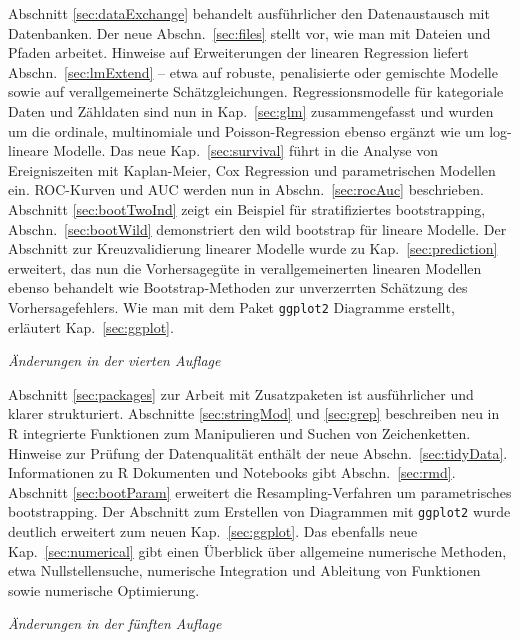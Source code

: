 Abschnitt \ref{sec:dataExchange} behandelt ausführlicher den Datenaustausch mit Datenbanken. Der neue  Abschn.\ \ref{sec:files} stellt vor, wie man mit Dateien und Pfaden arbeitet. Hinweise auf Erweiterungen der linearen Regression liefert Abschn.\ \ref{sec:lmExtend} -- etwa auf robuste, penalisierte oder gemischte Modelle sowie auf verallgemeinerte Schätzgleichungen. Regressionsmodelle für kategoriale Daten und Zähldaten sind nun in Kap.\ \ref{sec:glm} zusammengefasst und wurden um die ordinale, multinomiale und Poisson-Regression ebenso ergänzt wie um log-lineare Modelle. Das neue Kap.\ \ref{sec:survival} führt in die Analyse von Ereigniszeiten mit Kaplan-Meier, Cox Regression und parametrischen Modellen ein. ROC-Kurven und AUC werden nun in Abschn.\ \ref{sec:rocAuc} beschrieben. Abschnitt \ref{sec:bootTwoInd} zeigt ein Beispiel für stratifiziertes bootstrapping, Abschn.\ \ref{sec:bootWild} demonstriert den wild bootstrap für lineare Modelle. Der Abschnitt zur Kreuzvalidierung linearer Modelle wurde zu Kap.\ \ref{sec:prediction} erweitert, das nun die Vorhersagegüte in verallgemeinerten linearen Modellen ebenso behandelt wie Bootstrap-Methoden zur unverzerrten Schätzung des Vorhersagefehlers. Wie man mit dem Paket \lstinline!ggplot2! Diagramme erstellt, erläutert Kap.\ \ref{sec:ggplot}.

\textit{Änderungen in der vierten Auflage}

Abschnitt \ref{sec:packages} zur Arbeit mit Zusatzpaketen ist ausführlicher und klarer strukturiert. Abschnitte \ref{sec:stringMod} und \ref{sec:grep} beschreiben neu in R integrierte Funktionen zum Manipulieren und Suchen von Zeichenketten. Hinweise zur Prüfung der Datenqualität enthält der neue Abschn.\ \ref{sec:tidyData}. Informationen zu R Dokumenten und Notebooks gibt Abschn.\ \ref{sec:rmd}. Abschnitt \ref{sec:bootParam} erweitert die Resampling-Verfahren um parametrisches bootstrapping. Der Abschnitt zum Erstellen von Diagrammen mit \lstinline!ggplot2! wurde deutlich erweitert zum neuen Kap.\ \ref{sec:ggplot}. Das ebenfalls neue Kap.\ \ref{sec:numerical} gibt einen Überblick über allgemeine numerische Methoden, etwa Nullstellensuche, numerische Integration und Ableitung von Funktionen sowie numerische Optimierung.

\textit{Änderungen in der fünften Auflage}

